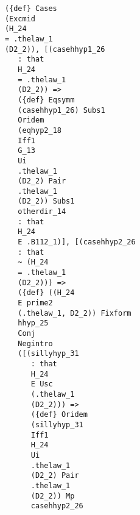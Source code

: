 \documentclass[12pt]{article}
\begin{document}
\begin{verbatim}
                                     ({def} Cases 
                                     (Excmid 
                                     (H_24 
                                     = .thelaw_1 
                                     (D2_2)), [(casehhyp1_26 
                                        : that 
                                        H_24 
                                        = .thelaw_1 
                                        (D2_2)) => 
                                        ({def} Eqsymm 
                                        (casehhyp1_26) Subs1 
                                        Oridem 
                                        (eqhyp2_18 
                                        Iff1 
                                        G_13 
                                        Ui 
                                        .thelaw_1 
                                        (D2_2) Pair 
                                        .thelaw_1 
                                        (D2_2)) Subs1 
                                        otherdir_14 
                                        : that 
                                        H_24 
                                        E .B112_1)], [(casehhyp2_26 
                                        : that 
                                        ~ (H_24 
                                        = .thelaw_1 
                                        (D2_2))) => 
                                        ({def} ((H_24 
                                        E prime2 
                                        (.thelaw_1, D2_2)) Fixform 
                                        hhyp_25 
                                        Conj 
                                        Negintro 
                                        ([(sillyhyp_31 
                                           : that 
                                           H_24 
                                           E Usc 
                                           (.thelaw_1 
                                           (D2_2))) => 
                                           ({def} Oridem 
                                           (sillyhyp_31 
                                           Iff1 
                                           H_24 
                                           Ui 
                                           .thelaw_1 
                                           (D2_2) Pair 
                                           .thelaw_1 
                                           (D2_2)) Mp 
                                           casehhyp2_26 

\end{verbatim}
\end{document}
